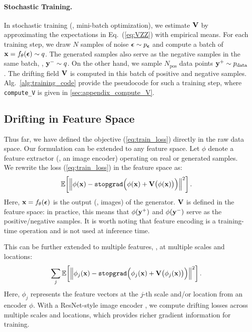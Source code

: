 \paragraph{Stochastic Training.}
In stochastic training (\eg, mini-batch optimization), we estimate $\mathbf{V}$ by approximating the expectations in Eq.~(\ref{eq:VZZ}) with empirical means.
For each training step, we draw $N$ samples of noise ${\boldsymbol{\epsilon}} \sim 
p_{\boldsymbol{\epsilon}}$ and compute a batch of $\mathbf{x}=f_\theta({\boldsymbol{\epsilon}})\sim q$.
The generated samples also serve as the negative samples in the same batch, \ie, $\mathbf{y}^- \sim q$.
On the other hand, we sample $N_\text{pos}$ data points $\mathbf{y}^+ \sim p_\text{data}$. The drifting field $\mathbf{V}$ is computed in this batch of positive and negative samples. 
Alg.~\ref{alg:training_code} provide the pseudocode for such a training step, where \texttt{compute\_V} is given in \cref{sec:appendix_compute_V}.

\subsection{Drifting in Feature Space}
\label{subsec:feature_space}

Thus far, we have defined the objective (\ref{eq:train_loss}) directly in the raw data space. Our formulation can be extended to any feature space.
Let $\phi$ denote a feature extractor (\eg, an image encoder) operating on real or generated samples. We rewrite the loss (\ref{eq:train_loss}) in the feature space as:
\begin{equation}
\mathbb{E}\!\left[
\left\|
\phi(\mathbf{x})
-
\text{\texttt{stopgrad}}\Big(
\phi(\mathbf{x})
+
\mathbf{V}\big(\phi(\mathbf{x})\big)
\Big)
\right\|^2
\right].
\label{eq:feature_space}
\end{equation}
Here, $\mathbf{x}=f_\theta({\boldsymbol{\epsilon}})$ is the output (\eg, images) of the generator. $\mathbf{V}$ is defined in the feature space: in practice, this means that
$\phi(\mathbf{y}^+)$ and $\phi(\mathbf{y}^-)$ serve as the positive/negative samples.
It is worth noting that feature encoding is a training-time operation and is not used at inference time.


This can be further extended to multiple features, \eg, at multiple scales and locations:
\begin{equation}
\sum_j\mathbb{E}\!\left[
\left\|
\phi_j(\mathbf{x})
-
\text{\texttt{stopgrad}}\Big(
\phi_j(\mathbf{x})
+
\mathbf{V}\big(\phi_j(\mathbf{x})\big)
\Big)
\right\|^2
\right].
\label{eq:feature_space_multi}
\end{equation}
Here, $\phi_j$ represents the feature vectors at the $j$-th scale and/or location from an encoder $\phi$.
With a ResNet-style image encoder \cite{he2016deep}, we compute drifting losses across multiple scales and locations, which provides richer gradient information for training.


